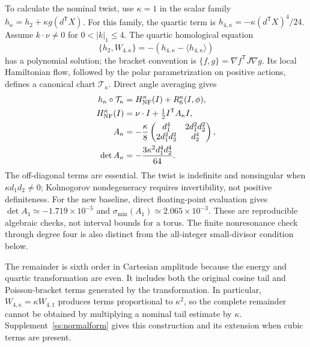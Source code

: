 To calculate the nominal twist, use $\kappa=1$ in the scalar family $h_\kappa=h_2+\kappa g(d^{\mathsf T}X)$. For this family, the quartic term is $h_{4,\kappa}=-\kappa(d^{\mathsf T}X)^4/24$. Assume
$k\cdot\nu\ne0$ for $0<|k|_1\le4$. The quartic homological equation
\begin{equation}\label{kam:homological}
 \{h_2,W_{4,\kappa}\}
    =-(h_{4,\kappa}-\langle h_{4,\kappa}\rangle)
\end{equation}
has a polynomial solution; the bracket convention is
$\{f,g\}=\nabla f^{\mathsf T}J\nabla g$.
Its local Hamiltonian flow, followed by the polar parametrization on positive actions, defines a canonical chart $\mathcal T_\kappa$. Direct angle averaging gives
\begin{equation}\label{kam:magnetic-twist}
\begin{aligned}
 h_\kappa\circ\mathcal T_\kappa
       &=H_{\rm NF}^{\kappa}(I)+R_6^\kappa(I,\phi),\\
 H_{\rm NF}^{\kappa}(I)
       &=\nu\cdot I+\tfrac12I^{\mathsf T}A_\kappa I,\\
 A_\kappa&=-\frac{\kappa}{8}
 \begin{pmatrix}
 d_1^4&2d_1^2d_2^2\\
 2d_1^2d_2^2&d_2^4
 \end{pmatrix},\\
 \det A_\kappa&=-\frac{3\kappa^2d_1^4d_2^4}{64}.
\end{aligned}
\end{equation}
The off-diagonal terms are essential. The twist is indefinite and nonsingular when $\kappa d_1d_2\ne0$; Kolmogorov nondegeneracy requires invertibility, not positive definiteness. For the new baseline, direct floating-point evaluation gives
$\det A_1\simeq-1.719\times10^{-5}$ and
$\sigma_{\min}(A_1)\simeq2.065\times10^{-3}$. These are reproducible algebraic checks, not interval bounds for a torus. The finite nonresonance check through degree four is also distinct from the all-integer small-divisor condition below.

The remainder is sixth order in Cartesian amplitude because the energy and quartic transformation are even. It includes both the original cosine tail and Poisson-bracket terms generated by the transformation. In particular, $W_{4,\kappa}=\kappa W_{4,1}$ produces terms proportional to $\kappa^2$, so the complete remainder cannot be obtained by multiplying a nominal tail estimate by $\kappa$. Supplement~\ref{ss:normalform} gives this construction and its extension when cubic terms are present.

